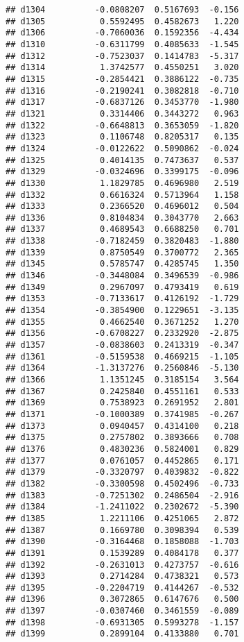 \documentclass[
]{article}
\begin{document}
\begin{verbatim}
## d1304          -0.0808207  0.5167693  -0.156
## d1305           0.5592495  0.4582673   1.220
## d1306          -0.7060036  0.1592356  -4.434
## d1310          -0.6311799  0.4085633  -1.545
## d1312          -0.7523037  0.1414783  -5.317
## d1314           1.3742577  0.4550251   3.020
## d1315          -0.2854421  0.3886122  -0.735
## d1316          -0.2190241  0.3082818  -0.710
## d1317          -0.6837126  0.3453770  -1.980
## d1321           0.3314406  0.3443272   0.963
## d1322          -0.6648813  0.3653059  -1.820
## d1323           0.1106748  0.8205317   0.135
## d1324          -0.0122622  0.5090862  -0.024
## d1325           0.4014135  0.7473637   0.537
## d1329          -0.0324696  0.3399175  -0.096
## d1330           1.1829785  0.4696980   2.519
## d1332           0.6616324  0.5713964   1.158
## d1333           0.2366520  0.4696012   0.504
## d1336           0.8104834  0.3043770   2.663
## d1337           0.4689543  0.6688250   0.701
## d1338          -0.7182459  0.3820483  -1.880
## d1339           0.8750549  0.3700772   2.365
## d1345           0.5785747  0.4285745   1.350
## d1346          -0.3448084  0.3496539  -0.986
## d1349           0.2967097  0.4793419   0.619
## d1353          -0.7133617  0.4126192  -1.729
## d1354          -0.3854900  0.1229651  -3.135
## d1355           0.4662540  0.3671252   1.270
## d1356          -0.6708227  0.2332920  -2.875
## d1357          -0.0838603  0.2413319  -0.347
## d1361          -0.5159538  0.4669215  -1.105
## d1364          -1.3137276  0.2560846  -5.130
## d1366           1.1351245  0.3185154   3.564
## d1367           0.2425840  0.4551161   0.533
## d1369           0.7538923  0.2691952   2.801
## d1371          -0.1000389  0.3741985  -0.267
## d1373           0.0940457  0.4314100   0.218
## d1375           0.2757802  0.3893666   0.708
## d1376           0.4830236  0.5824001   0.829
## d1377           0.0761057  0.4452865   0.171
## d1379          -0.3320797  0.4039832  -0.822
## d1382          -0.3300598  0.4502496  -0.733
## d1383          -0.7251302  0.2486504  -2.916
## d1384          -1.2411022  0.2302672  -5.390
## d1385           1.2211106  0.4251065   2.872
## d1387           0.1669780  0.3098394   0.539
## d1390          -0.3164468  0.1858088  -1.703
## d1391           0.1539289  0.4084178   0.377
## d1392          -0.2631013  0.4273757  -0.616
## d1393           0.2714284  0.4738321   0.573
## d1395          -0.2204719  0.4144267  -0.532
## d1396           0.3072865  0.6147676   0.500
## d1397          -0.0307460  0.3461559  -0.089
## d1398          -0.6931305  0.5993278  -1.157
## d1399           0.2899104  0.4133880   0.701

\end{verbatim}
\end{document}
